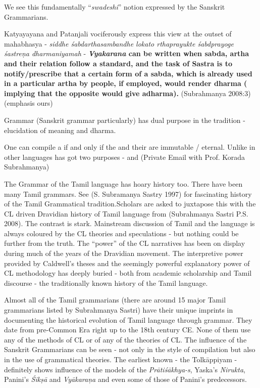 We see this fundamentally “\textit{swadeshi}” notion expressed by the Sanskrit Grammarians.

\begin{myquote}
Katyayayana and Patanjali vociferously express this view at the outset of mahabhasya - \textit{siddhe śabdarthasambandhe lokato rthaprayukte śabdprayoge śastreṇa dharmaniyamah} - \textbf{\textit{Vyakarana} can be written when sabda, artha and their relation follow a standard, and the task of Sastra is to notify/prescribe that a certain form of a sabda, which is already used in a particular artha by people, if employed, would render dharma ( implying that the opposite would give adharma).} (Subrahmanya 2008:3) (emphasis ours)
\end{myquote}

Grammar (Sanskrit grammar particularly) has dual purpose in the tradition - elucidation of meaning and dharma.

\begin{myquote}
One can compile a  if and only if the  and their  are immutable / eternal. Unlike in other languages  has got two purposes -  and  (Private Email with Prof. Korada Subrahmanya)
\end{myquote}

The Grammar of the Tamil language has hoary history too. There have been many Tamil grammars. See (S. Subramanya Sastry 1997) for fascinating history of the Tamil Grammatical tradition.Scholars are asked to juxtapose this with the CL driven Dravidian history of Tamil language from (Subrahmanya Sastri P.S. 2008). The contrast is stark. Mainstream discussion of Tamil and the language is always coloured by the CL theories and speculations - but nothing could be further from the truth. The “power” of the CL narratives has been on display during much of the years of the Dravidian movement. The interpretive power provided by Caldwell’s theses and the seemingly powerful explanatory power of CL methodology has deeply buried - both from academic scholarship and Tamil discourse - the traditionally known history of the Tamil language.

\newpage

Almost all of the Tamil grammarians (there are around 15 major Tamil grammarians listed by Subrahmanya Sastri) have their unique imprints in documenting the historical evolution of Tamil language through grammar. They date from pre-Common Era right up to the 18th century CE. None of them use any of the methods of CL or of any of the theories of CL. The influence of the Sanskrit Grammarians can be seen - not only in the style of compilation but also in the use of grammatical theories. The earliest known - the Tolkāppiyam - definitely shows influence of the models of the \textit{Prātiśākhya-s}, Yaska’s \textit{Nirukta}, Panini’s \textit{Śikṣā} and \textit{Vyākaraņa} and even some of those of Panini’s predecessors.

